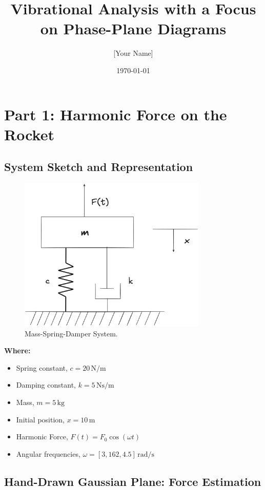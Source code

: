 \documentclass[12pt,a4paper]{article}
\title{Vibrational Analysis with a Focus on Phase-Plane Diagrams}
\author{[Your Name]}
\date{\today}
\begin{document}
\maketitle
\tableofcontents
\newpage

\section{Part 1: Harmonic Force on the Rocket}
\subsection{System Sketch and Representation}
\begin{figure}[H]
    \centering
    \includegraphics[width=0.8\textwidth]{msd_harmonic.png} 
    \caption{Mass-Spring-Damper System.}
    \label{fig:system}
\end{figure}
\textbf{Where:}
\begin{itemize}
    \item Spring constant, \(c = 20 \, \text{N/m}\)
    \item Damping constant, \(k = 5 \, \text{Ns/m}\)
    \item Mass, \(m = 5 \, \text{kg}\)
    \item Initial position, \(x = 10 \, \text{m}\)
    \item Harmonic Force, \(F(t) = F_0 \cos(\omega t)\)
    \item Angular frequencies, \(\omega = [3, 162, 4.5] \, \text{rad/s}\)
\end{itemize}

\subsection{Hand-Drawn Gaussian Plane: Force Estimation}
\end{document}
